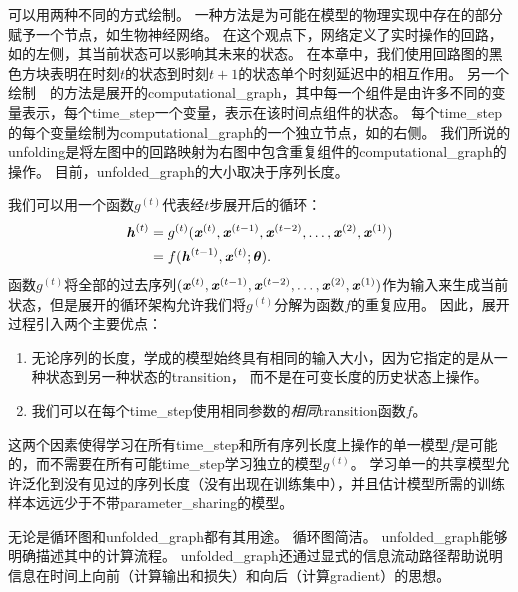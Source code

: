 
可以用两种不同的方式绘制。
一种方法是为可能在模型的物理实现中存在的部分赋予一个节点，如生物神经网络。
在这个观点下，网络定义了实时操作的回路，如的左侧，其当前状态可以影响其未来的状态。
在本章中，我们使用回路图的黑色方块表明在时刻$t$的状态到时刻$t+1$的状态单个时刻延迟中的相互作用。
另一个绘制~~的方法是展开的\gls{computational_graph}，其中每一个组件是由许多不同的变量表示，每个\gls{time_step}一个变量，表示在该时间点组件的状态。
每个\gls{time_step}的每个变量绘制为\gls{computational_graph}的一个独立节点，如的右侧。
我们所说的\gls{unfolding}是将左图中的回路映射为右图中包含重复组件的\gls{computational_graph}的操作。
目前，\gls{unfolded_graph}的大小取决于序列长度。

我们可以用一个函数$g^{(t)}$代表经$t$步展开后的循环：
\begin{align}
\label{eq:106}
  \boldsymbol{\mathit{h}}^{(t)} &=g^{(t)}(\boldsymbol{\mathit{x}}^{(t)},\boldsymbol{\mathit{x}}^{(t-1)}, \boldsymbol{\mathit{x}}^{(t-2)},\dots,\boldsymbol{\mathit{x}}^{(2)}, \boldsymbol{\mathit{x}}^{(1)}) \\
  & =  f(\boldsymbol{\mathit{h}}^{(t-1)}, \boldsymbol{\mathit{x}}^{(t)} ; \boldsymbol{\theta}) .
\end{align}
函数$g^{(t)}$将全部的过去序列$(\boldsymbol{\mathit{x}}^{(t)},\boldsymbol{\mathit{x}}^{(t-1)}, \boldsymbol{\mathit{x}}^{(t-2)},\dots,\boldsymbol{\mathit{x}}^{(2)}, \boldsymbol{\mathit{x}}^{(1)})$作为输入来生成当前状态，但是展开的循环架构允许我们将$g^{(t)}$分解为函数$f$的重复应用。
因此，展开过程引入两个主要优点：
\begin{enumerate}
 \item 无论序列的长度，学成的模型始终具有相同的输入大小，因为它指定的是从一种状态到另一种状态的\gls{transition}， 而不是在可变长度的历史状态上操作。
 \item 我们可以在每个\gls{time_step}使用相同参数的\emph{相同}\gls{transition}函数$f$。
\end{enumerate}
这两个因素使得学习在所有\gls{time_step}和所有序列长度上操作的单一模型$f$是可能的，而不需要在所有可能\gls{time_step}学习独立的模型$g^{(t)}$。
学习单一的共享模型允许泛化到没有见过的序列长度（没有出现在训练集中），并且估计模型所需的训练样本远远少于不带\gls{parameter_sharing}的模型。


无论是循环图和\gls{unfolded_graph}都有其用途。
循环图简洁。
\gls{unfolded_graph}能够明确描述其中的计算流程。
\gls{unfolded_graph}还通过显式的信息流动路径帮助说明信息在时间上向前（计算输出和损失）和向后（计算\gls{gradient}）的思想。

